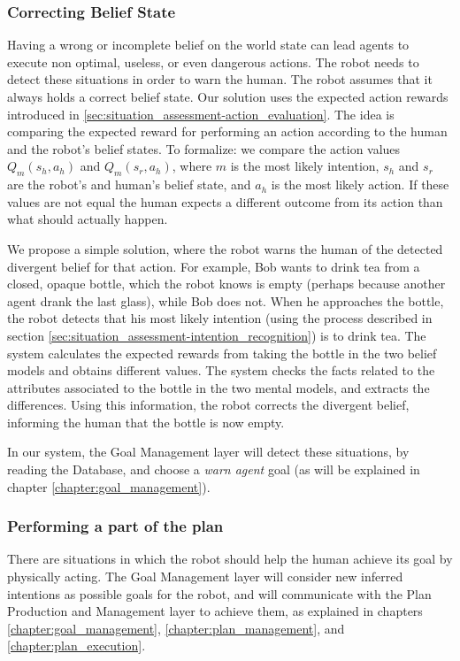 \subsubsection{Correcting Belief State}
Having a wrong or incomplete belief on the world state can lead agents to execute non optimal, useless, or even dangerous actions. The robot needs to detect these situations in order to warn the human. The robot assumes that it always holds a correct belief state. Our solution uses the expected action rewards introduced in \ref{sec:situation_assessment-action_evaluation}. The idea is comparing the expected reward for performing an action according to the human and the robot's belief states. To formalize: we compare the action values \(Q_m(s_h,a_h)\) and \(Q_m(s_r,a_h)\), where $m$ is the most likely intention,  $s_h$ and $s_r$ are the robot's and human's belief state, and $a_h$ is the most likely action. If these values are not equal the human expects a different outcome from its action than what should actually happen. 

We propose a simple solution, where the robot warns the human of the detected divergent belief for that action. For example, Bob wants to drink tea from a closed, opaque bottle, which the robot knows is empty (perhaps because another agent drank the last glass), while Bob does not. When he approaches the bottle, the robot detects that his most likely intention (using the process described in section \ref{sec:situation_assessment-intention_recognition}) is to drink tea. The system calculates the expected rewards from taking the bottle in the two belief models and obtains different values. The system checks the facts related to the attributes associated to the bottle in the two mental models, and extracts the differences. Using this information, the robot corrects the divergent belief, informing the human that the bottle is now empty. 

In our system, the Goal Management layer will detect these situations, by reading the Database, and choose a \textit{warn agent} goal (as will be explained in chapter \ref{chapter:goal_management}).

\subsubsection{Performing a part of the plan}
There are situations in which the robot should help the human achieve its goal by physically acting. The Goal Management layer will consider new inferred intentions as possible goals for the robot, and will communicate with the Plan Production and Management layer to achieve them, as explained in chapters \ref{chapter:goal_management}, \ref{chapter:plan_management}, and \ref{chapter:plan_execution}. 


